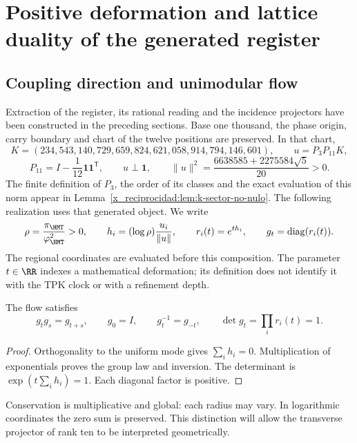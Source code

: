 \chapter{Positive deformation and lattice duality of the generated register}
\label{x_reciprocidad:rec:positiva}

\section{Coupling direction and unimodular flow}

Extraction of the register, its rational reading and the incidence projectors have been constructed in the preceding sections. Base one thousand, the phase origin, carry boundary and chart of the twelve positions are preserved. In that chart,
\[
 K=(234,543,140,729,659,824,621,058,914,794,146,601),
 \qquad u=P_3P_{11}K,
\]
\[
 P_{11}=I-\frac1{12}\mathbf1\mathbf1^{\mathsf T},\qquad
 u\perp\mathbf1,\qquad
 \|u\|^2=\frac{6638585+2275584\sqrt5}{20}>0.
\]
The finite definition of \(P_3\), the order of its classes and the exact evaluation of this norm appear in Lemma~\ref{x_reciprocidad:lem:k-sector-no-nulo}. The following realization uses that generated object. We write
\begin{equation}
 \rho=\frac{\pi_{\HMT}}{\varphi_{\HMT}^2}>0,\qquad
 h_i=(\log\rho)\frac{u_i}{\|u\|},\qquad
 r_i(t)=e^{th_i},\qquad g_t=\operatorname{diag}(r_i(t)).
 \label{x_reciprocidad:rec:eq:flujo}
\end{equation}
The regional coordinates are evaluated before this composition. The parameter \(t\in\RR\) indexes a mathematical deformation; its definition does not identify it with the TPK clock or with a refinement depth.

\begin{proposition}
\label{x_reciprocidad:rec:prop:flujo}
The flow satisfies
\[
 g_tg_s=g_{t+s},\qquad g_0=I,\qquad g_t^{-1}=g_{-t},\qquad
 \det g_t=\prod_i r_i(t)=1.
\]
\end{proposition}
\begin{proof}
Orthogonality to the uniform mode gives \(\sum_i h_i=0\). Multiplication of exponentials proves the group law and inversion. The determinant is \(\exp(t\sum_i h_i)=1\). Each diagonal factor is positive.
\end{proof}

Conservation is multiplicative and global: each radius may vary. In logarithmic coordinates the zero sum is preserved. This distinction will allow the transverse projector of rank ten to be interpreted geometrically.

